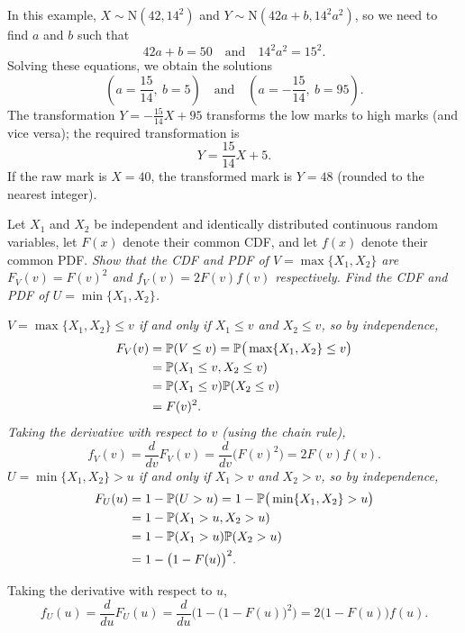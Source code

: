 \begin{exercise}
\begin{questions}
\begin{answer}
In this example, $X\sim\text{N}(42,14^2)$ and $Y\sim\text{N}(42a+b,14^2a^2)$, so we need to find $a$ and $b$ such that
\[
42a + b = 50 \quad\text{and}\quad 14^2a^2 = 15^2.
\]
Solving these equations, we obtain the solutions
\[
\left(a = \frac{15}{14},\ b=5\right) \quad\text{and}\quad \left(a = -\frac{15}{14},\ b=95\right). 
\]
The transformation $Y=-\displaystyle\frac{15}{14}X + 95$ transforms the low marks to high marks (and vice versa); the required transformation is 
\[
Y=\displaystyle\frac{15}{14}X + 5.
\]
If the raw mark is $X=40$, the transformed mark is $Y = 48$ (rounded to the nearest integer).
\end{answer}

\question
Let $X_1$ and $X_2$ be independent and identically distributed continuous random variables, let $F(x)$ denote their common CDF, and let $f(x)$ denote their common PDF. 
\ben
\it Show that the CDF and PDF of $V=\max\{X_1,X_2\}$ are $F_V(v)=F(v)^2$ and $f_V(v) = 2F(v)f(v)$ respectively.
\it Find the CDF and PDF of $U=\min\{X_1,X_2\}$.
\een
\begin{answer}
\ben
\it %
$V=\max\{X_1,X_2\}\leq v$ if and only if $X_1\leq v$ and $X_2\leq v$, so by independence,
\begin{align*}
F_V(v) 
	& = \mathbb{P}(V\leq v) = \mathbb{P}\big(\max\{X_1,X_2\}\leq v\big) \\
	& = \mathbb{P}(X_1\leq v,X_2\leq v) \\
	& = \mathbb{P}(X_1\leq v)\mathbb{P}(X_2\leq v) \\
	& = F(v)^2.
\end{align*}
Taking the derivative with respect to $v$ (using the chain rule),
\[
f_V(v) = \frac{d}{dv}F_V(v) = \frac{d}{dv}\big(F(v)^2\big) =2F(v)f(v).
\]
\it %
$U=\min\{X_1,X_2\}>u$ if and only if $X_1> v$ and $X_2> v$, so by independence,
\begin{align*}
F_U(u) 
	& = 1- \mathbb{P}(U > u) = 1-\mathbb{P}\big(\min\{X_1,X_2\} > u\big) \\
	& = 1-\mathbb{P}(X_1 > u, X_2 > u) \\
	& = 1-\mathbb{P}(X_1 > u)\mathbb{P}(X_2 > u) \\
	& = 1-\big(1-F(u)\big)^2.
\end{align*}

Taking the derivative with respect to $u$,
\[
f_U(u) = \frac{d}{du}F_U(u) = \frac{d}{du}\Big(1-\big(1-F(u)\big)^2\Big) = 2\big(1-F(u)\big)f(u).
\]
\een
\end{answer}


\end{questions}
\end{exercise}
